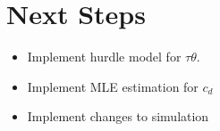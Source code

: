 \documentclass[11pt]{article}
\theoremstyle{ModifiedStyle}
\theoremstyle{ModifiedStyle}
\begin{document}
\section{Next Steps}
  \begin{itemize}
    \item Implement hurdle model for $\tau \theta$.
    \item Implement MLE estimation for $c_d$
    \item Implement changes to simulation
  \end{itemize}

 \printbibliography
\end{document}
